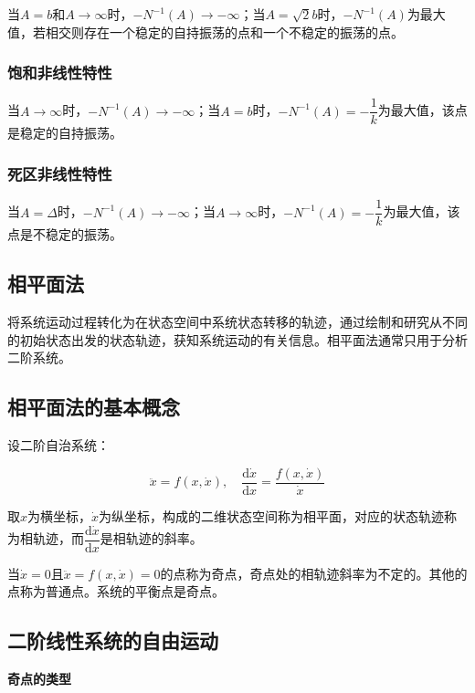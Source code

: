 \documentclass[cn, blue, normal, 12pt]{elegantnote}
\begin{document}
当$A=b$和$A\rightarrow \infty$时，$-N^{-1}(A)\rightarrow-\infty$；当$A=\sqrt{2}b$时，$-N^{-1}(A)$为最大值，若相交则存在一个稳定的自持振荡的点和一个不稳定的振荡的点。

\subsubsection{饱和非线性特性}

当$A\rightarrow \infty$时，$-N^{-1}(A)\rightarrow-\infty$；当$A=b$时，$-N^{-1}(A)=-\dfrac{1}{k}$为最大值，该点是稳定的自持振荡。

\subsubsection{死区非线性特性}

当$A=\Delta$时，$-N^{-1}(A)\rightarrow-\infty$；当$A\rightarrow \infty$时，$-N^{-1}(A)=-\dfrac{1}{k}$为最大值，该点是不稳定的振荡。

\subsection{相平面法}

将系统运动过程转化为在状态空间中系统状态转移的轨迹，通过绘制和研究从不同的初始状态出发的状态轨迹，获知系统运动的有关信息。相平面法通常只用于分析二阶系统。

\subsection{相平面法的基本概念}

设二阶自治系统：

\begin{equation}
    \ddot{x}=f(x,\dot{x}), \quad \frac{\mathrm{d}\dot{x}}{{\mathrm{d}x}}=\frac{f(x,\dot{x})}{\dot{x}}
\end{equation}

取$x$为横坐标，$\dot{x}$为纵坐标，构成的二维状态空间称为相平面，对应的状态轨迹称为相轨迹，而$\dfrac{\mathrm{d}\dot{x}}{\mathrm{d}x}$是相轨迹的斜率。

当$\dot{x}=0$且$\ddot{x}=f(x,\dot{x})=0$的点称为奇点，奇点处的相轨迹斜率为不定的。其他的点称为普通点。系统的平衡点是奇点。

\subsection{二阶线性系统的自由运动}

\textbf{奇点的类型}
\end{document}
